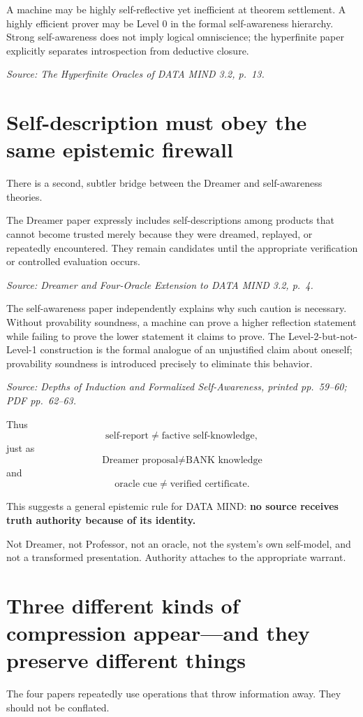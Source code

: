 \documentclass[11pt]{article}
\newcommand{\src}[1]{\par\smallskip\noindent\textit{Source: #1}\normalsize}
\begin{document}
A machine may be highly self-reflective yet inefficient at theorem settlement. A highly efficient prover may be Level 0 in the formal self-awareness hierarchy. Strong self-awareness does not imply logical omniscience; the hyperfinite paper explicitly separates introspection from deductive closure.
\src{\emph{The Hyperfinite Oracles of DATA MIND 3.2}, p.~13.}

\section{Self-description must obey the same epistemic firewall}

There is a second, subtler bridge between the Dreamer and self-awareness theories.

The Dreamer paper expressly includes self-descriptions among products that cannot become trusted merely because they were dreamed, replayed, or repeatedly encountered. They remain candidates until the appropriate verification or controlled evaluation occurs.
\src{\emph{Dreamer and Four-Oracle Extension to DATA MIND 3.2}, p.~4.}

The self-awareness paper independently explains why such caution is necessary. Without provability soundness, a machine can prove a higher reflection statement while failing to prove the lower statement it claims to prove. The Level-2-but-not-Level-1 construction is the formal analogue of an unjustified claim about oneself; provability soundness is introduced precisely to eliminate this behavior.
\src{\emph{Depths of Induction and Formalized Self-Awareness}, printed pp.~59--60; PDF pp.~62--63.}

Thus
\[
\text{self-report}\neq\text{factive self-knowledge},
\]
just as
\[
\text{Dreamer proposal}\neq\text{BANK knowledge}
\]
and
\[
\text{oracle cue}\neq\text{verified certificate}.
\]

This suggests a general epistemic rule for DATA MIND: \textbf{no source receives truth authority because of its identity.}

Not Dreamer, not Professor, not an oracle, not the system's own self-model, and not a transformed presentation. Authority attaches to the appropriate warrant.

\section{Three different kinds of compression appear---and they preserve different things}

The four papers repeatedly use operations that throw information away. They should not be conflated.
\end{document}
